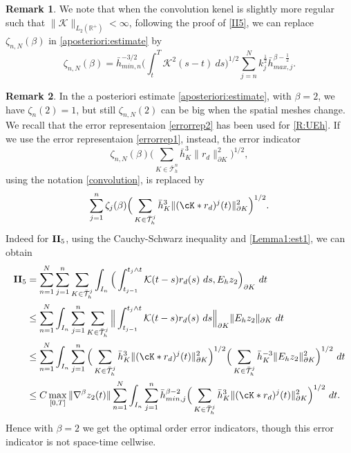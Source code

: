 \documentclass{amsart}
\numberwithin{equation}{section}
\theoremstyle{definition}
\newtheorem{remark}{Remark}
\begin{document}
\begin{remark} \label{rem_beta_L2}
We note that when the convolution kenel is slightly more regular 
such that $\|{\mathcal K}\|_{L_2(\mathbb{R}^+)} < \infty$, following the proof of  
\eqref{II5}, we can replace $\zeta_{n,N}(\beta)$ in \eqref{aposteriori:estimate} 
by
\begin{equation*}
  \zeta_{n,N}(\beta)
   = \bar h_{min,n}^{-3/2} \Big(\int_t^T{\mathcal K}^2(s-t)\ ds\Big)^{1/2}
    \sum_{j=n}^N k_j^{\frac{1}{2}} \bar h_{max,j}^{\beta-\frac{1}{2}}.
\end{equation*}
\end{remark}

\begin{remark} \label{rem_ZetanN_to_Zetaj}
In the a posteriori estimate \eqref{aposteriori:estimate}, with $\beta=2$, 
we have $\zeta_n(2)=1$, but still $\zeta_{n,N}(2)$ can be big when the spatial 
meshes change. 
We recall that the error representaion \eqref{errorrep2} has been used 
for \eqref{R:UEh}. If  we use the error representaion \eqref{errorrep1}, 
instead, the error indicator 
\begin{equation*}
  \zeta_{n,N}(\beta)
    \Big(\sum_{K\in\bar{\mathcal T}_h^n}\bar h_K^3\|r_d\|_{\partial K}^2
    \Big)^{1/2},
\end{equation*}
using the notation \eqref{convolution}, is replaced by 
\begin{equation*}
  \sum_{j=1}^n \zeta_j(\beta)
    \Big(\sum_{K\in\bar{\mathcal T}_h^j}\bar h_K^3\|(\cK*r_d)^j(t)\|_{\partial K}^2
    \Big)^{1/2}.
\end{equation*}
Indeed for ${\rm{\bf II}}_5$, using the Cauchy-Schwarz inequality and 
\eqref{Lemma1:est1}, we can obtain
\begin{equation*}  
  \begin{split}
    {\rm{\bf II}}_5
    &= \sum_{n=1}^N\sum_{j=1}^n\sum_{K \in \bar {\mathcal T}^j_h}
      \int_{I_n}\Big( \int_{t_{j-1}}^{t_j \wedge t} {\mathcal K}(t-s)r_d(s)\ ds, 
        E_hz_2 \Big)_{\partial K}\  dt\\
    &\leq \sum_{n=1}^N \int_{I_n} \sum_{j=1}^n\sum_{K \in \bar {\mathcal T}^j_h}
      \Big\| \int_{t_{j-1}}^{t_j \wedge t} {\mathcal K}(t-s)r_d(s)\ ds \Big\|_{\partial K} 
        \|E_hz_2\|_{\partial K}\ dt \\
    &\leq \sum_{n=1}^N \int_{I_n} \sum_{j=1}^n
      \Big(\sum_{K \in \bar {\mathcal T}^j_h} \bar h_K^3
      \| (\cK*r_d)^j(t)\|_{\partial K}^2\Big)^{1/2}
      \Big(\sum_{K \in \bar {\mathcal T}^j_h} \bar h_K^{-3} 
        \|E_hz_2\|_{\partial K}^2\Big)^{1/2}\ dt\\
    &\leq C \max_{[0,T]} \|\nabla^\beta z_2(t)\|
      \sum_{n=1}^N \int_{I_n} \sum_{j=1}^n \bar h_{min,j}^{\beta-2}
      \Big(\sum_{K \in \bar {\mathcal T}^j_h} \bar h_K^3
      \| (\cK*r_d)^j(t)\|_{\partial K}^2\Big)^{1/2}\ dt.
  \end{split}
\end{equation*}
Hence with $\beta=2$ we get the optimal order error indicators, 
though this error indicator is not space-time cellwise. 
\end{remark}
\end{document}
